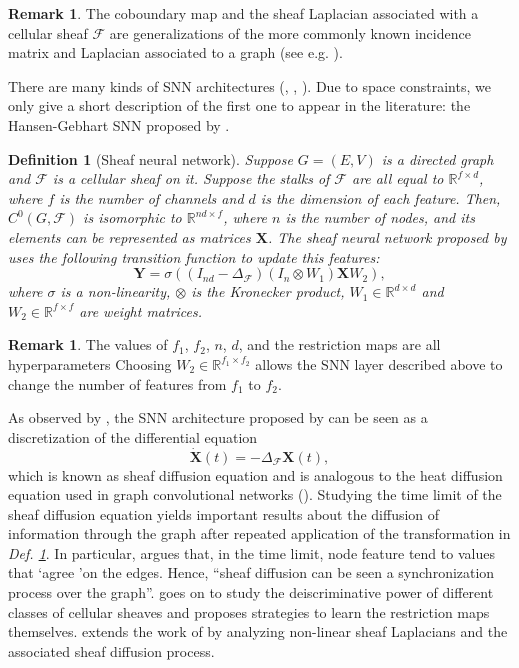 \documentclass[11pt,a4paper,openright,twoside]{report}
\newcounter{mycounter}
\theoremstyle{plain}
\newtheorem{definition}[mycounter]{Definition}
\theoremstyle{definition}
\newtheorem{remark}[mycounter]{Remark}
\newcommand\dblquote[1]{\textquotedblleft #1\textquotedblright}
\begin{document}
\begin{remark}
  The coboundary map and the sheaf Laplacian associated with a cellular sheaf $\mathcal{F}$ are generalizations of the more commonly known incidence matrix and Laplacian associated to a graph (see e.g. \cite{ward2022practical}).
\end{remark}

There are many kinds of SNN architectures (\cite{hansen2020sheaf}, \cite{bodnar2022neural}, \cite{zaghen2024nonlinear}). Due to space constraints, we only give a short description of the first one to appear in the literature: the Hansen-Gebhart SNN proposed by \cite{hansen2020sheaf}.

\begin{definition}[Sheaf neural network]
  \label{def: sheafnn}
  Suppose $G = (E,V)$ is a directed graph and $\mathcal{F}$ is a cellular sheaf on it. Suppose the stalks of $\mathcal{F}$ are all equal to $\mathbb{R}^{f \times d}$, where $f$ is the number of channels and $d$ is the dimension of each feature. Then, $C^0(G, \mathcal{F})$ is isomorphic to $\mathbb{R}^{nd \times f}$, where $n$ is the number of nodes, and its elements can be represented as matrices $\mathbf{X}$. The sheaf neural network proposed by \cite{hansen2020sheaf} uses the following transition function to update this features:
  \[\mathbf{Y} = \sigma((I_{nd} - \Delta_{\mathcal{F}})(I_{n} \otimes W_1)\mathbf{X}W_2),\]
  where $\sigma$ is a non-linearity, $\otimes$ is the Kronecker product, $W_1 \in \mathbb{R}^{d \times d}$ and $W_2 \in \mathbb{R}^{f \times f}$ are weight matrices.
\end{definition}

\begin{remark}
  The values of $f_1$, $f_2$, $n$, $d$, and the restriction maps are all hyperparameters
  Choosing $W_2 \in \mathbb{R}^{f_1 \times f_2}$ allows the SNN layer described above to change the number of features from $f_1$ to $f_2$.  
\end{remark}

As observed by \cite{bodnar2022neural}, the SNN architecture proposed by \cite{hansen2020sheaf} can be seen as a discretization of the differential equation 
\[\dot{\mathbf{X}}(t) = -\Delta_{\mathcal{F}}\mathbf{X}(t),\]
which is known as sheaf diffusion equation and is analogous to the heat diffusion equation used in graph convolutional networks (\cite{bodnar2022neural}). Studying the time limit of the sheaf diffusion equation yields important results about the diffusion of information through the graph after repeated application of the transformation in \textit{Def. \ref{def: sheafnn}}. In particular, \cite{bodnar2022neural} argues that, in the time limit, node feature tend to values that \lq agree \rq on the edges. Hence, \dblquote{sheaf diffusion can be seen a synchronization process over the graph}. \cite{bodnar2022neural} goes on to study the deiscriminative power of different classes of cellular sheaves and proposes strategies to learn the restriction maps themselves. \cite{zaghen2024nonlinear} extends the work of \cite{bodnar2022neural} by analyzing non-linear sheaf Laplacians and the associated sheaf diffusion process.
\end{document}
